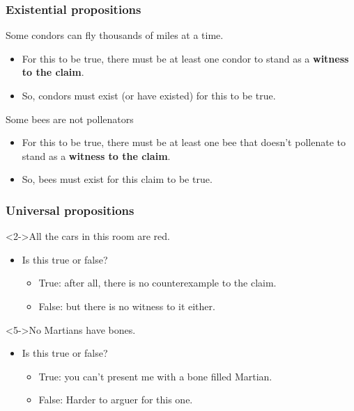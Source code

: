 \documentclass[10pt,letterpaper,xcolor=dvipsnames,handout]{beamer}
\begin{document}
\begin{frame}
  \frametitle{Existential propositions}
  
  \begin{block}{Some condors can fly thousands of miles at a time.}
    \begin{itemize}
      \item For this to be true, there must be at least one condor to stand as a \textbf{witness to the claim}.
      \item So, condors must exist (or have existed) for this to be true.
    \end{itemize}
  \end{block}
  
  \begin{block}{Some bees are not pollenators}
    \begin{itemize}
      \item For this to be true, there must be at least one bee that doesn't pollenate to stand as a \textbf{witness to the claim}.
      \item So, bees must exist for this claim to be true.
    \end{itemize}
  \end{block}
  
\end{frame}

\begin{frame}
  \frametitle{Universal propositions}
  
  \begin{block}<2->{All the cars in this room are red.}
    \begin{itemize}
      \item<2-> Is this true or false?
        \begin{itemize}
          \item<3-> True: after all, there is no counterexample to the claim.
          \item<4-> False: but there is no witness to it either.
        \end{itemize}
    \end{itemize}
  \end{block}
  
  \begin{block}<5->{No Martians have bones.}
    \begin{itemize}
      \item<5-> Is this true or false?
      \begin{itemize}
        \item<6-> True: you can't present me with a bone filled Martian.
        \item<7-> False: Harder to arguer for this one.
      \end{itemize}
    \end{itemize}
  \end{block}
  
\end{frame}
\end{document}
